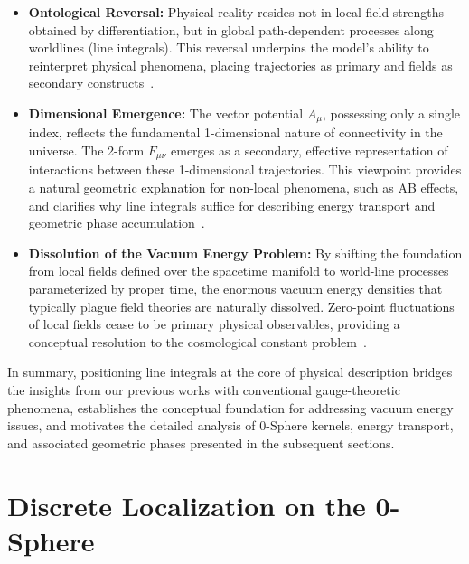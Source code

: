 \documentclass[%
 reprint,
 amsmath,amssymb,
 aps,
 prb,
]{revtex4-2}
\numberwithin{equation}{section}
\begin{document}
\begin{itemize}
    \item \textbf{Ontological Reversal:} Physical reality resides not in local field strengths obtained by differentiation, but in global path-dependent processes along worldlines (line integrals). 
    This reversal underpins the model’s ability to reinterpret physical phenomena, placing trajectories as primary and fields as secondary constructs~\cite{hanamura18135855}.

    \item \textbf{Dimensional Emergence:} The vector potential $A_\mu$, possessing only a single index, reflects the fundamental 1-dimensional nature of connectivity in the universe. 
    The 2-form $F_{\mu\nu}$ emerges as a secondary, effective representation of interactions between these 1-dimensional trajectories. 
    This viewpoint provides a natural geometric explanation for non-local phenomena, such as AB effects, and clarifies why line integrals suffice for describing energy transport and geometric phase accumulation~\cite{hanamura18203433}.
        
    \item \textbf{Dissolution of the Vacuum Energy Problem:} By shifting the foundation from local fields defined over the spacetime manifold to world-line processes parameterized by proper time, the enormous vacuum energy densities that typically plague field theories are naturally dissolved. 
    Zero-point fluctuations of local fields cease to be primary physical observables, providing a conceptual resolution to the cosmological constant problem~\cite{hanamura18275142}.
    
\end{itemize}

\medskip
In summary, positioning line integrals at the core of physical description bridges the insights from our previous works with conventional gauge-theoretic phenomena, establishes the conceptual foundation for addressing vacuum energy issues, and motivates the detailed analysis of 0-Sphere kernels, energy transport, and associated geometric phases presented in the subsequent sections.

\section{Discrete Localization on the 0-Sphere}
\label{sec:zerosphere}
\end{document}

